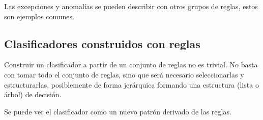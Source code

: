 \documentclass[a4paper,11pt,spanish]{report}
\let\stdsub\subsection
\let\stdsubsub\subsubsection
\renewcommand{\section}{\stdsub}
\renewcommand{\subsection}{\stdsubsub}
\begin{document}
Las excepciones y anomalías se pueden describir con otros grupos de reglas, estos son ejemplos comunes.


\section{Clasificadores construidos con reglas}
\label{sec-4-6-2}

Construir un clasificador a partir de un conjunto de reglas no es trivial. No basta con tomar todo el conjunto de reglas, sino que será necesario seleccionarlas y estructurarlas, posiblemente de forma jerárquica formando una estructura (lista o árbol) de decisión.

Se puede ver el clasificador como un nuevo patrón derivado de las reglas.
\end{document}
